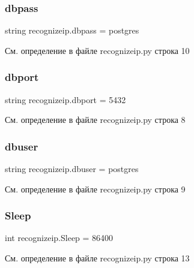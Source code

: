 \subsubsection{\texorpdfstring{dbpass}{dbpass}}
{\footnotesize\ttfamily string recognizeip.\+dbpass = \textquotesingle{}postgres\textquotesingle{}}



См. определение в файле recognizeip.\+py строка 10

\mbox{\label{namespacerecognizeip_ae2d5ad4fcc3fcd7393e4a18f53282798}} 
\subsubsection{\texorpdfstring{dbport}{dbport}}
{\footnotesize\ttfamily string recognizeip.\+dbport = \textquotesingle{}5432\textquotesingle{}}



См. определение в файле recognizeip.\+py строка 8

\mbox{\label{namespacerecognizeip_acc52b089af5fa13c73a78f70daa56494}} 
\subsubsection{\texorpdfstring{dbuser}{dbuser}}
{\footnotesize\ttfamily string recognizeip.\+dbuser = \textquotesingle{}postgres\textquotesingle{}}



См. определение в файле recognizeip.\+py строка 9

\mbox{\label{namespacerecognizeip_ad79dcdb5a4cb450c8945c8fe3185e85a}} 
\subsubsection{\texorpdfstring{Sleep}{Sleep}}
{\footnotesize\ttfamily int recognizeip.\+Sleep = 86400}



См. определение в файле recognizeip.\+py строка 13

